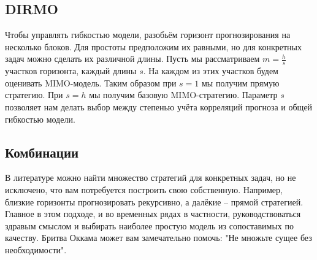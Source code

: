 \documentclass[12pt,fleqn]{article}
\begin{document}
\subsection{DIRMO}
Чтобы управлять гибкостью модели, разобьём горизонт прогнозирования на несколько блоков. Для простоты предположим их равными, но для конкретных задач можно сделать их различной длины. Пусть мы рассматриваем $m=\frac{h}{s}$ участков горизонта, каждый длины $s$. На каждом из этих участков будем оценивать MIMO-модель. Таким образом при $s=1$ мы получим прямую стратегию. При $s=h$ мы получим базовую MIMO-стратегию. Параметр $s$ позволяет нам делать выбор между степенью учёта корреляций прогноза и общей гибкостью модели.

\subsection{Комбинации}
В литературе можно найти множество стратегий для конкретных задач, но не исключено, что вам потребуется построить свою собственную.
Например, близкие горизонты прогнозировать рекурсивно, а далёкие -- прямой стратегией.
Главное в этом подходе, и во временных рядах в частности, руководствоваться здравым смыслом и выбирать наиболее простую модель из сопоставимых по качеству. 
Бритва Оккама может вам замечательно помочь: "Не множьте сущее без необходимости".
\end{document}
